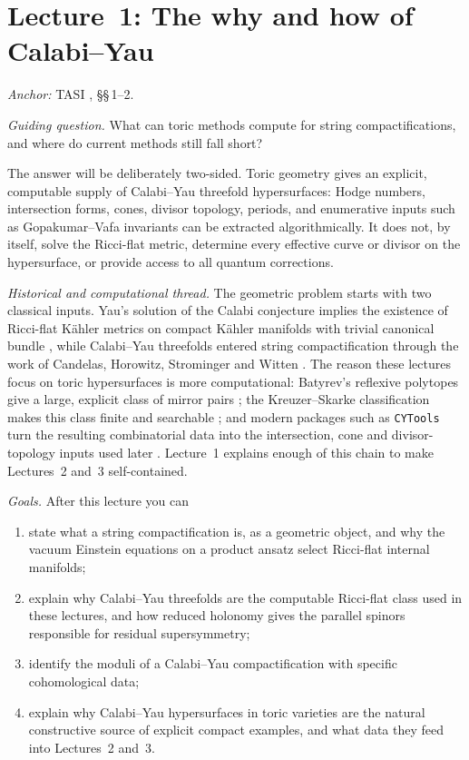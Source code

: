 
\section{Lecture~1: The why and how of Calabi--Yau}\label{sec:L1}

\medskip

\noindent\textit{Anchor:} TASI \cite{McAllister:2025qwq},
\S\S\,1--2.

\medskip
\noindent\textit{Guiding question.} What can toric methods compute
for string compactifications, and where do current methods still
fall short?

The answer will be deliberately two-sided. Toric geometry gives an
explicit, computable supply of Calabi--Yau threefold hypersurfaces:
Hodge numbers, intersection forms, cones, divisor topology, periods,
and enumerative inputs such as Gopakumar--Vafa invariants can be
extracted algorithmically. It does not, by itself, solve the
Ricci-flat metric, determine every effective curve or divisor on the
hypersurface, or provide access to all quantum corrections.

\medskip
\noindent\textit{Historical and computational thread.}
The geometric problem starts with two classical inputs. Yau's
solution of the Calabi conjecture implies the existence of
Ricci-flat K\"ahler metrics on compact K\"ahler manifolds with
trivial canonical bundle \cite{Yau:1978cfy}, while Calabi--Yau
threefolds entered string compactification through the work of
Candelas, Horowitz, Strominger and Witten
\cite{Candelas:1985en}. The reason these lectures focus on toric
hypersurfaces is more computational: Batyrev's reflexive polytopes
give a large, explicit class of mirror pairs
\cite{Batyrev:1993oya}; the Kreuzer--Skarke classification makes
this class finite and searchable \cite{Kreuzer:2000xy}; and modern
packages such as \texttt{CYTools} turn the resulting combinatorial
data into the intersection, cone and divisor-topology inputs used
later \cite{Demirtas:2022hqf}. Lecture~1 explains enough of this
chain to make Lectures~2 and~3 self-contained.

\medskip
\noindent\textit{Goals.} After this lecture you can
\begin{enumerate}[nosep,leftmargin=*]
    \item state what a string compactification is, as a geometric
    object, and why the vacuum Einstein equations on a product ansatz
    select Ricci-flat internal manifolds;
    \item explain why Calabi--Yau threefolds are the computable
    Ricci-flat class used in these lectures, and how reduced holonomy
    gives the parallel spinors responsible for residual
    supersymmetry;
    \item identify the moduli of a Calabi--Yau compactification with
    specific cohomological data;
    \item explain why Calabi--Yau hypersurfaces in toric varieties
    are the natural constructive source of explicit compact examples,
    and what data they feed into Lectures~2 and~3.
\end{enumerate}


